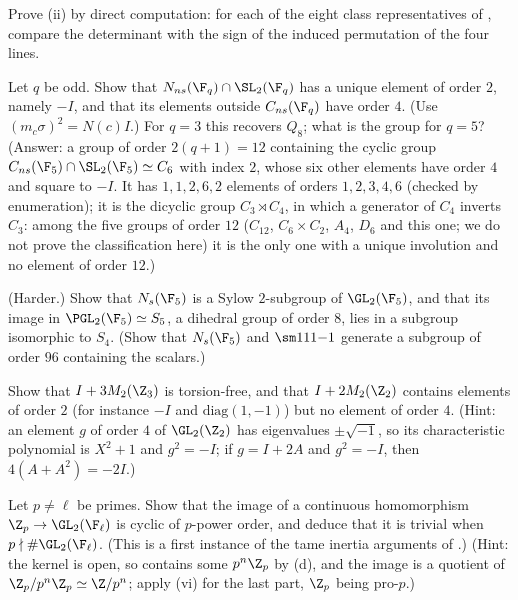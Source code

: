 \begin{exercise}\label{ex:groups:ex10}
Prove (ii) by direct computation: for each of the eight class representatives of , compare the determinant
with the sign of the induced permutation of the four lines.
\end{exercise}

\begin{exercise}\label{ex:groups:ex11}
Let $q$ be odd. Show that $N_{ns}(\F_q)\cap\SL_2(\F_q)$ has a unique element of order $2$, namely $-I$, and that its elements outside $C_{ns}(\F_q)$ have order $4$. (Use
$(m_c\sigma)^2=N(c)I$.) For $q=3$ this recovers $Q_8$; what is the group for $q=5$?
(Answer: a group of order $2(q+1)=12$ containing the cyclic group $C_{ns}(\F_5)\cap\SL_2(\F_5)\simeq C_6$ with index $2$, whose six other elements have order $4$ and
square to $-I$. It has $1,1,2,6,2$ elements of orders $1,2,3,4,6$ (checked by enumeration); it is the dicyclic group $C_3\rtimes C_4$, in which a generator of $C_4$
inverts $C_3$: among the five groups of order $12$ ($C_{12}$, $C_6\times C_2$, $A_4$, $D_6$ and this one; we do not prove the classification here) it is the only
one with a unique involution and no element of order $12$.)
\end{exercise}

\begin{exercise}\label{ex:groups:ex12}
(Harder.) Show that $N_s(\F_5)$ is a Sylow $2$-subgroup of $\GL_2(\F_5)$, and that its image in $\PGL_2(\F_5)\simeq S_5$, a dihedral group of order $8$, lies in a subgroup
isomorphic to $S_4$. (Show that $N_s(\F_5)$ and $\sm111{-1}$ generate a subgroup of order $96$ containing the scalars.)
\end{exercise}

\begin{exercise}\label{ex:groups:ex13}
Show that $I+3M_2(\Z_3)$ is torsion-free, and that $I+2M_2(\Z_2)$ contains elements of order $2$ (for instance $-I$ and $\mathrm{diag}(1,-1)$) but no element of order $4$.
(Hint: an element $g$ of order $4$ of $\GL_2(\Z_2)$ has eigenvalues $\pm\sqrt{-1}$, so its characteristic polynomial is $X^2+1$ and $g^2=-I$; if $g=I+2A$ and $g^2=-I$, then $4(A+A^2)=-2I$.)
\end{exercise}

\begin{exercise}\label{ex:groups:ex14}
Let $p\ne\ell$ be primes. Show that the image of a continuous homomorphism $\Z_p\to\GL_2(\F_\ell)$ is cyclic of $p$-power order, and deduce that it is trivial when
$p\nmid\#\GL_2(\F_\ell)$. (This is a first instance of the tame inertia arguments of .)
(Hint: the kernel is open, so contains some $p^n\Z_p$ by (d), and the image is a quotient of $\Z_p/p^n\Z_p\simeq\Z/p^n$; apply
(vi) for the last part, $\Z_p$ being pro-$p$.)
\end{exercise}

